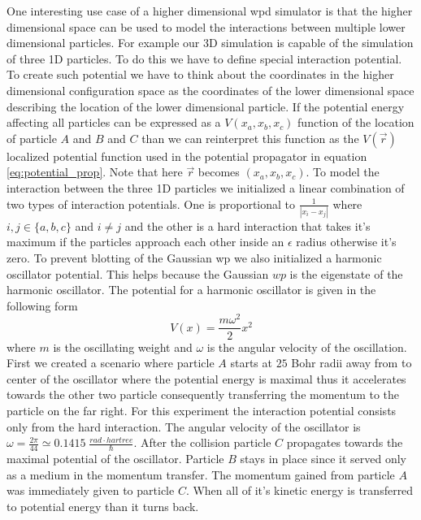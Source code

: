 One interesting use case of a higher dimensional \acrshort{wpd} simulator is that the higher dimensional space can be used to model the interactions between multiple lower dimensional particles.
For example our 3D simulation is capable of the simulation of three 1D particles.
To do this we have to define special interaction potential.
To create such potential we have to think about the coordinates in the higher dimensional configuration space as the coordinates of the lower dimensional space describing the location of the lower dimensional particle.
If the potential energy affecting all particles can be expressed as a $V(x_a, x_b, x_c)$ function of the location of particle $A$ and $B$ and $C$ than we can reinterpret this function as the $V(\vec{r})$ localized potential function used in the potential propagator in equation \ref{eq:potential_prop}.
Note that here $\vec{r}$ becomes $(x_a, x_b, x_c)$.
To model the interaction between the three 1D particles we initialized a linear combination of two types of interaction potentials.
One is proportional to $\frac{1}{|x_i - x_j|}$ where $i,j\in\{a,b,c\}$ and $i\neq j$ and the other is a hard interaction that takes it's maximum if the particles approach each other inside an $\epsilon$ radius otherwise it's zero.
To prevent blotting of the Gaussian \acrshort{wp} we also initialized a harmonic oscillator potential.
This helps because the Gaussian $wp$ is the eigenstate of the harmonic oscillator.
The potential for a harmonic oscillator is given in the following form
\begin{equation}
	\label{eq:harmonic_osc}
	V(x) = \frac{m\omega^2}{2}x^2
\end{equation}
where $m$ is the oscillating weight and $\omega$ is the angular velocity of the oscillation.
First we created a scenario where particle $A$ starts at $25$ Bohr radii away from to center of the oscillator where the potential energy is maximal thus it accelerates towards the other two particle consequently transferring the momentum to the particle on the far right.
For this experiment the interaction potential consists only from the hard interaction.
The angular velocity of the oscillator is $\omega = \frac{2\pi}{44} \simeq 0.1415\; \frac{rad\cdot hartree}{\hbar}$.
After the collision particle $C$ propagates towards the maximal potential of the oscillator.
Particle $B$ stays in place since it served only as a medium in the momentum transfer.
The momentum gained from particle $A$ was immediately given to particle $C$.
When all of it's kinetic energy is transferred to potential energy than it turns back.
